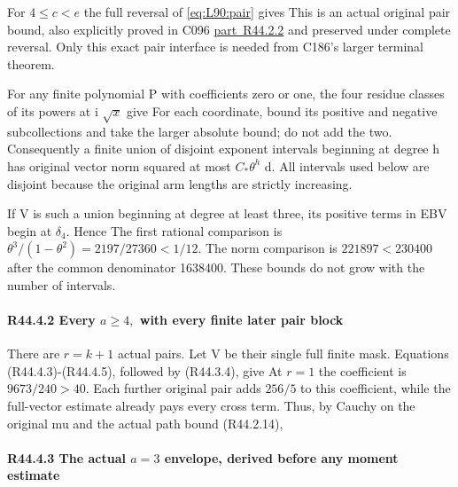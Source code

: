 For \(4\le c<e\) the full reversal of \eqref{eq:L90:pair} gives
This is an actual original pair bound, also explicitly proved in
C096 \mbox{\hyperref[part:R44.2.2]{part R44.2.2}} and preserved under complete reversal. Only this
exact pair interface is needed from C186's larger terminal theorem.

For any finite polynomial P with coefficients zero or one, the four
residue classes of its powers at i \(\sqrt{x}\) give
For each coordinate, bound its positive and negative subcollections
and take the larger absolute bound; do not add the two. Consequently
a finite union of disjoint exponent intervals beginning at degree h
has original vector norm squared at most \(C_*\theta^h\) d.
All intervals used below are disjoint because the original arm
lengths are strictly increasing.

If V is such a union beginning at degree at least three, its positive
terms in EBV begin at \(\delta_4.\) Hence
The first rational comparison is
\(\theta^3/(1-\theta^2)=2197/27360<1/12.\)
The norm comparison is \(221897<230400\) after the common denominator
1638400. These bounds do not grow with the number of intervals.

\paragraph{R44.4.2 Every \(a\ge 4,\allowbreak \) with every finite later pair block}

There are \(r=k+1\) actual pairs. Let V be their single full finite mask.
Equations (R44.4.3)-(R44.4.5), followed by (R44.3.4), give
At \(r=1\) the coefficient is \(9673/240>40.\) Each further original
pair adds \(256/5\) to this coefficient, while the full-vector estimate
already pays every cross term. Thus, by Cauchy on the original mu
and the actual path bound (R44.2.14),


\paragraph{R44.4.3 The actual \(a=3\) envelope, derived before any moment estimate}

